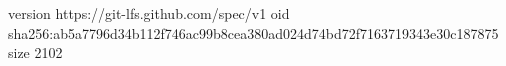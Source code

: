 version https://git-lfs.github.com/spec/v1
oid sha256:ab5a7796d34b112f746ac99b8cea380ad024d74bd72f7163719343e30c187875
size 2102
